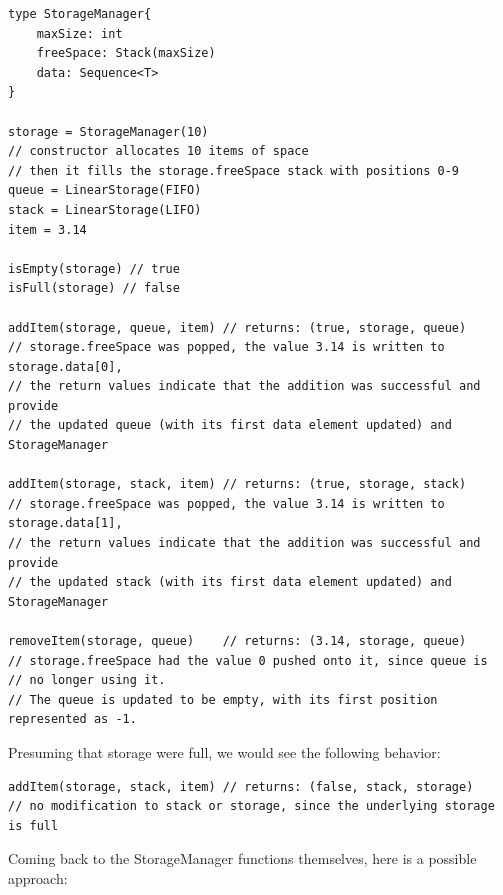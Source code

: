 \documentclass[10pt,letterpaper,final]{report}
\begin{document}
\begin{verbatim}
type StorageManager{
    maxSize: int
    freeSpace: Stack(maxSize)
    data: Sequence<T>
}

storage = StorageManager(10)
// constructor allocates 10 items of space
// then it fills the storage.freeSpace stack with positions 0-9
queue = LinearStorage(FIFO)
stack = LinearStorage(LIFO)
item = 3.14

isEmpty(storage) // true
isFull(storage) // false

addItem(storage, queue, item) // returns: (true, storage, queue)
// storage.freeSpace was popped, the value 3.14 is written to storage.data[0],
// the return values indicate that the addition was successful and provide
// the updated queue (with its first data element updated) and StorageManager

addItem(storage, stack, item) // returns: (true, storage, stack)
// storage.freeSpace was popped, the value 3.14 is written to storage.data[1],
// the return values indicate that the addition was successful and provide
// the updated stack (with its first data element updated) and StorageManager

removeItem(storage, queue)    // returns: (3.14, storage, queue)
// storage.freeSpace had the value 0 pushed onto it, since queue is
// no longer using it.
// The queue is updated to be empty, with its first position represented as -1.
\end{verbatim}

\noindent Presuming that storage were full, we would see the following behavior:

\begin{verbatim}
addItem(storage, stack, item) // returns: (false, stack, storage)
// no modification to stack or storage, since the underlying storage is full
\end{verbatim}

Coming back to the StorageManager functions themselves, here is a possible approach:
\end{document}
